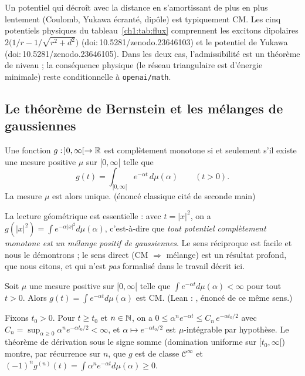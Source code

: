 \begin{physbox}
Un potentiel qui décroît avec la distance en s'amortissant \og de plus en plus lentement \fg{} (Coulomb, Yukawa écranté, dipôle) est typiquement CM.
Les cinq potentiels physiques du tableau~\ref{ch1:tab:flux} comprennent les excitons dipolaires $2\bigl(1/r-1/\sqrt{r^2+d^2}\bigr)$ (doi:\,10.5281/zenodo.23646103) et le potentiel de Yukawa
(doi:\,10.5281/zenodo.23646105). Dans les deux cas, l'admissibilité est un théorème de niveau \tierA{} ; la conséquence physique (le réseau triangulaire est
d'énergie minimale) reste conditionnelle à \texttt{openai/math}.
\end{physbox}

\subsection{Le théorème de Bernstein et les mélanges de gaussiennes}

\begin{theorem}\label{ch1:thm:bernstein}
Une fonction $g:\,]0,\infty[\to\mathbb{R}$ est complètement monotone si et seulement s'il existe une mesure positive $\mu$ sur $[0,\infty[$ telle que
\[
  g(t)=\int_{[0,\infty[}e^{-\alpha t}\,d\mu(\alpha)\qquad(t>0).
\]
La mesure $\mu$ est alors unique. \tierL{} (énoncé classique cité de seconde main)~\cite{bernstein,widder}
\end{theorem}

La lecture géométrique est essentielle : avec $t=|x|^2$, on a $g(|x|^2)=\int e^{-\alpha|x|^2}d\mu(\alpha)$, c'est-à-dire que \emph{tout potentiel complètement monotone
est un mélange positif de gaussiennes}. Le sens \og réciproque \fg{} est facile et nous le démontrons ; le sens direct (CM $\Rightarrow$ mélange) est un résultat
profond, que nous citons, et qui n'est \emph{pas} formalisé dans le travail décrit ici.

\begin{proposition}\label{ch1:prop:facile}
Soit $\mu$ une mesure positive sur $[0,\infty[$ telle que $\int e^{-\alpha t}d\mu(\alpha)<\infty$ pour tout $t>0$. Alors $g(t)=\int e^{-\alpha t}d\mu(\alpha)$ est CM.
\tierC{} (Lean :  \tierA{}, énoncé de ce même sens.)
\end{proposition}

\begin{humanproof}
Fixons $t_0>0$. Pour $t\ge t_0$ et $n\in\mathbb{N}$, on a $0\le\alpha^ne^{-\alpha t}\le C_n\,e^{-\alpha t_0/2}$ avec
$C_n=\sup_{\alpha\ge0}\alpha^ne^{-\alpha t_0/2}<\infty$, et $\alpha\mapsto e^{-\alpha t_0/2}$ est $\mu$-intégrable par hypothèse. Le théorème de dérivation sous le signe
somme (domination uniforme sur $[t_0,\infty[$) montre, par récurrence sur $n$, que $g$ est de classe $\mathcal C^\infty$ et
$(-1)^ng^{(n)}(t)=\int\alpha^ne^{-\alpha t}d\mu(\alpha)\ge0$.
\end{humanproof}

